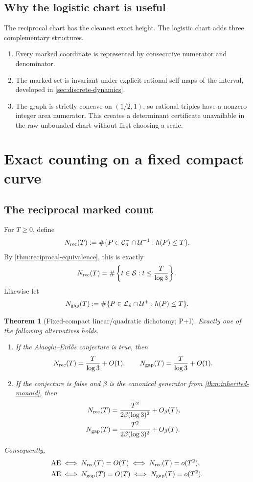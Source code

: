 \documentclass[10pt,oneside]{article}
\newtheorem{theorem}{Theorem}[section]
\theoremstyle{definition}
\theoremstyle{remark}
\newcommand{\Sol}{\mathcal S}
\newcommand{\thetaq}{\vartheta}
\newcommand{\rec}{\mathcal C^-_{\thetaq}}
\newcommand{\logcurve}{\mathcal L_{\thetaq}}
\newcommand{\unitrec}{\mathcal U^{-1}}
\newcommand{\unitgap}{\mathcal U^{+}}
\newcommand{\AEconj}{\mathrm{AE}}
\newcommand{\statusP}{\textsc{P}}
\newcommand{\statusI}{\textsc{I}}
\begin{document}
\subsection{Why the logistic chart is useful}
The reciprocal chart has the cleanest exact height.  The logistic chart adds three complementary structures.
\begin{enumerate}
\item Every marked coordinate is represented by consecutive numerator and denominator.
\item The marked set is invariant under explicit rational self-maps of the interval, developed in \cref{sec:discrete-dynamics}.
\item The graph is strictly concave on \((1/2,1)\), so rational triples have a nonzero integer area numerator.  This creates a determinant certificate unavailable in the raw unbounded chart without first choosing a scale.
\end{enumerate}

\section{Exact counting on a fixed compact curve}
\label{sec:counting}

\subsection{The reciprocal marked count}
For \(T\ge0\), define
\[
 N_{\rm rec}(T):=
 \#\{P\in\rec\cap\unitrec:h(P)\le T\}.
\]
By \cref{thm:reciprocal-equivalence}, this is exactly
\[
 N_{\rm rec}(T)=
 \#\left\{t\in\Sol:t\le\frac{T}{\log3}\right\}.
\]
Likewise let
\[
 N_{\rm gap}(T):=
 \#\{P\in\logcurve\cap\unitgap:h(P)\le T\}.
\]

\begin{theorem}[Fixed-compact linear/quadratic dichotomy; \statusP+\statusI]
\label{thm:compact-dichotomy}
Exactly one of the following alternatives holds.
\begin{enumerate}[label=\textup{(\roman*)}]
\item If the Alaoglu--Erd\H{o}s conjecture is true, then
\[
 N_{\rm rec}(T)=\frac{T}{\log3}+O(1),
 \qquad
 N_{\rm gap}(T)=\frac{T}{\log3}+O(1).
\]
\item If the conjecture is false and \(\beta\) is the canonical generator from \cref{thm:inherited-monoid}, then
\begin{align*}
 N_{\rm rec}(T)
 &=\frac{T^2}{2\beta(\log3)^2}+O_\beta(T),\\
 N_{\rm gap}(T)
 &=\frac{T^2}{2\beta(\log3)^2}+O_\beta(T).
\end{align*}
\end{enumerate}
Consequently,
\begin{align}
 \AEconj
 &\iff N_{\rm rec}(T)=O(T)
  \iff N_{\rm rec}(T)=o(T^2),\label{eq:rec-equivalence}\\
 \AEconj
 &\iff N_{\rm gap}(T)=O(T)
  \iff N_{\rm gap}(T)=o(T^2).\label{eq:gap-equivalence}
\end{align}
\end{theorem}
\end{document}
